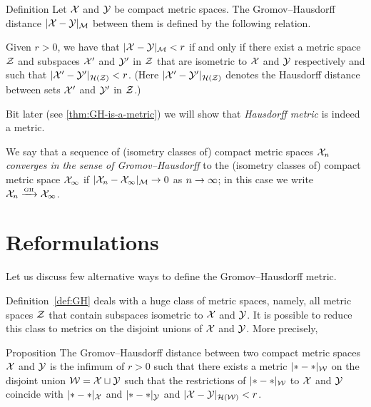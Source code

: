 \begin{thm}{Definition}\label{def:GH}
Let $\mathcal{X}$ and $\mathcal{Y}$ be compact metric spaces. 
The Gromov--Hausdorff distance $|\mathcal{X}-\mathcal{Y}|_{\mathcal{M}}$
between them is defined by the following
relation.
 
Given  $r > 0$, we have that $|\mathcal{X}-\mathcal{Y}|_{\mathcal{M}} < r$ if and only if there exist a metric
space $\mathcal{Z}$ and subspaces $\mathcal{X}'$ and $\mathcal{Y}'$ in $\mathcal{Z}$ that are isometric to $\mathcal{X}$ and $\mathcal{Y}$
respectively and such that $|\mathcal{X}'-\mathcal{Y}'|_{\mathcal{H}(\mathcal{Z})} < r$. 
(Here $|\mathcal{X}'-\mathcal{Y}'|_{\mathcal{H}(\mathcal{Z})}$ denotes the Hausdorff distance between sets $\mathcal{X}'$ and $\mathcal{Y}'$ in $\mathcal{Z}$.)
\end{thm}

Bit later (see \ref{thm:GH-is-a-metric}) we will show that \emph{Hausdorff metric} is indeed a metric.

We say that a sequence
of (isometry classes of) compact metric spaces $\mathcal{X}_n$ 
\emph{converges in the sense of Gromov--Hausdorff} to the (isometry classes of)
compact metric space $\mathcal{X}_\infty$ if $|\mathcal{X}_n - \mathcal{X}_\infty|_{\mathcal{M}} \to 0$ as $n\z\to\infty$;
in this case we write $\mathcal{X}_n\xrightarrow{\mbox{\tiny GH}} \mathcal{X}_\infty$.

\section{Reformulations}

Let us discuss few alternative ways to define the Gromov--Hausdorff metric.

Definition~\ref{def:GH} deals with a huge class of metric spaces,
namely, all metric spaces $\mathcal{Z}$ that contain subspaces isometric to $\mathcal{X}$ and $\mathcal{Y}$.
It is possible to reduce this class to metrics on the disjoint unions of $\mathcal{X}$ and $\mathcal{Y}$. 
More precisely, 

\begin{thm}{Proposition}\label{prop:GH=X+Y}
The Gromov--Hausdorff distance between two compact metric spaces $\mathcal{X}$
and $\mathcal{Y}$ is the infimum of $r > 0$ such that there exists a metric
$|{*}-{*}|_{\mathcal{W}}$ on the disjoint union $\mathcal{W}=\mathcal{X}\sqcup \mathcal{Y}$ 
such that the restrictions of $|{*}-{*}|_{\mathcal{W}}$ to $\mathcal{X}$ and $\mathcal{Y}$
coincide with $|{*}-{*}|_{\mathcal{X}}$ and $|{*}-{*}|_{\mathcal{Y}}$ 
and $|\mathcal{X}-\mathcal{Y}|_{\mathcal{H}(\mathcal{W})} < r$. 
\end{thm}


